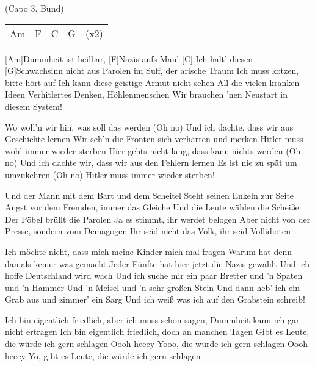 
{\footnotesize (Capo 3. Bund)}

\begin{guitar}
	{\footnotesize\begin{tabular}{l|l|l|l l}
			Am & F & C & G & (x2)
	\end{tabular}}
	
	[Am]Dummheit ist heilbar, [F]Nazis aufs Maul
	[C] Ich halt' diesen [G]Schwachsinn nicht aus
	Parolen im Suff, der arische Traum
	Ich muss kotzen, bitte hört auf
	Ich kann diese geistige Armut nicht sehen
	All die vielen kranken Ideen
	Verhitlertes Denken, Höhlenmenschen
	Wir brauchen 'nen Neustart in diesem System!
	
	Wo woll'n wir hin, was soll das werden (Oh no)
	Und ich dachte, dass wir aus Geschichte lernen
	Wir seh'n die Fronten sich verhärten und merken
	Hitler muss wohl immer wieder sterben
	Hier gehts nicht lang, dass kann nichts werden (Oh no)
	Und ich dachte wir, dass wir aus den Fehlern lernen
	Es ist nie zu spät um umzukehren (Oh no)
	Hitler muss immer wieder sterben!
	
	Und der Mann mit dem Bart und dem Scheitel
	Steht seinen Enkeln zur Seite
	Angst vor dem Fremden, immer das Gleiche
	Und die Leute wählen die Scheiße
	Der Pöbel brüllt die Parolen
	Ja es stimmt, ihr werdet belogen
	Aber nicht von der Presse, sondern vom Demagogen
	Ihr seid nicht das Volk, ihr seid Vollidioten

	\pagebreak
	Ich möchte nicht, dass mich meine Kinder mich mal fragen
	Warum hat denn damals keiner was gemacht
	Jeder Fünfte hat hier jetzt die Nazis gewählt
	Und ich hoffe Deutschland wird wach
	Und ich suche mir ein paar Bretter und 'n Spaten und 'n Hammer
	Und 'n Meisel und 'n sehr großen Stein
	Und dann heb' ich ein Grab aus und zimmer' ein Sarg
	Und ich weiß was ich auf den Grabstein schreib!
	
	 
	
	Ich bin eigentlich friedlich, aber ich muss schon sagen,
	Dummheit kann ich gar nicht ertragen
	Ich bin eigentlich friedlich, doch an manchen Tagen
	Gibt es Leute, die würde ich gern schlagen
	Oooh heeey
	Yooo, die würde ich gern schlagen
	Oooh heeey 
	Yo, gibt es Leute, die würde ich gern schlagen
	

\end{guitar}
